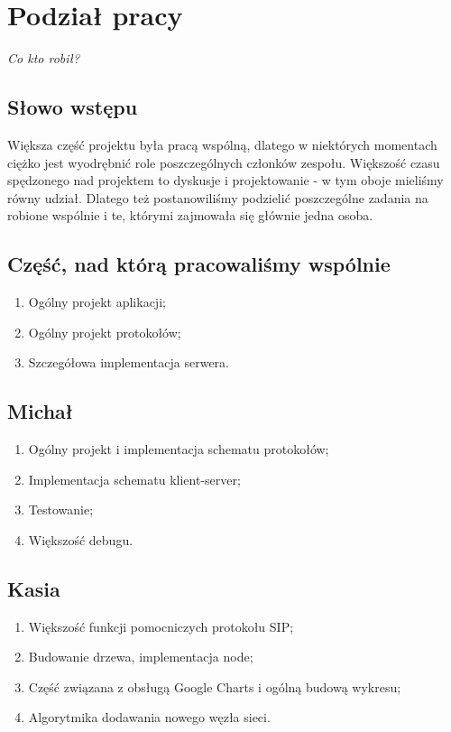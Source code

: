 \section{Podział pracy}

\begin{center}
\textit{Co kto robił?}
\end{center}

\subsection{Słowo wstępu}
Większa część projektu była pracą wspólną, dlatego w niektórych momentach ciężko jest wyodrębnić role poszczególnych członków zespołu. Większość czasu spędzonego nad projektem to dyskusje i projektowanie - w tym oboje mieliśmy równy udział. Dlatego też postanowiliśmy podzielić poszczególne zadania na robione wspólnie i te, którymi zajmowała się głównie jedna osoba.


\subsection{Część, nad którą pracowaliśmy wspólnie}
\begin{enumerate}
\item %
Ogólny projekt aplikacji;
\item %
Ogólny projekt protokołów;
\item %
Szczegółowa implementacja serwera.
\end{enumerate}


\subsection{Michał}
\begin{enumerate}
\item %
Ogólny projekt i implementacja schematu protokołów;
\item %
Implementacja schematu klient-server;
\item %
Testowanie;
\item %
Większość debugu.

\end{enumerate}


\subsection{Kasia}
\begin{enumerate}
\item %
Większość funkcji pomocniczych protokołu SIP;
\item %
Budowanie drzewa, implementacja node;
\item %
Część związana z obsługą Google Charts i ogólną budową wykresu;
\item %
Algorytmika dodawania nowego węzła sieci.

\end{enumerate}
